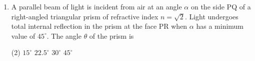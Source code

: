 
\begin{enumerate}
    \item A parallel beam of light is incident from air at an angle $\alpha$ on the side PQ of a right-angled triangular prism of refractive index $n = \sqrt{2}$. Light undergoes total internal reflection in the prism at the face PR when $\alpha$ has a minimum value of $45^\circ$. The angle $\theta$ of the prism is
        \begin{tasks}(2)
            \task $15^\circ$
            \task $22.5^\circ$
            \task $30^\circ$
            \task $45^\circ$
        \end{tasks}
        \begin{center}
        \end{center}
\end{enumerate}
